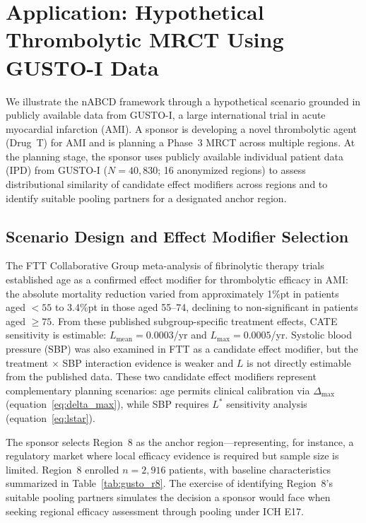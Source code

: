 \section{Application: Hypothetical Thrombolytic MRCT Using GUSTO-I Data}\label{sec:application}

We illustrate the nABCD framework through a hypothetical scenario grounded in publicly available data from GUSTO-I, a large international trial in acute myocardial infarction (AMI). A sponsor is developing a novel thrombolytic agent (Drug~T) for AMI and is planning a Phase~3 MRCT across multiple regions. At the planning stage, the sponsor uses publicly available individual patient data (IPD) from GUSTO-I ($N = 40{,}830$; 16 anonymized regions)\cite{gusto1993} to assess distributional similarity of candidate effect modifiers across regions and to identify suitable pooling partners for a designated anchor region.

\subsection{Scenario Design and Effect Modifier Selection}\label{sec:app_scenario}

The FTT Collaborative Group\cite{ftt1994} meta-analysis of fibrinolytic therapy trials established age as a confirmed effect modifier for thrombolytic efficacy in AMI: the absolute mortality reduction varied from approximately 1\%pt in patients aged $<55$ to 3.4\%pt in those aged 55--74, declining to non-significant in patients aged $\geq75$. From these published subgroup-specific treatment effects, CATE sensitivity is estimable: $L_{\text{mean}} = 0.0003$/yr and $L_{\max} = 0.0005$/yr. Systolic blood pressure (SBP) was also examined in FTT as a candidate effect modifier, but the treatment $\times$ SBP interaction evidence is weaker and $L$ is not directly estimable from the published data. These two candidate effect modifiers represent complementary planning scenarios: age permits clinical calibration via $\Delta_{\max}$ (equation~\ref{eq:delta_max}), while SBP requires $L^*$ sensitivity analysis (equation~\ref{eq:lstar}).

The sponsor selects Region~8 as the anchor region---representing, for instance, a regulatory market where local efficacy evidence is required but sample size is limited. Region~8 enrolled $n = 2{,}916$ patients, with baseline characteristics summarized in Table~\ref{tab:gusto_r8}. The exercise of identifying Region~8's suitable pooling partners simulates the decision a sponsor would face when seeking regional efficacy assessment through pooling under ICH E17.\cite{iche17}

